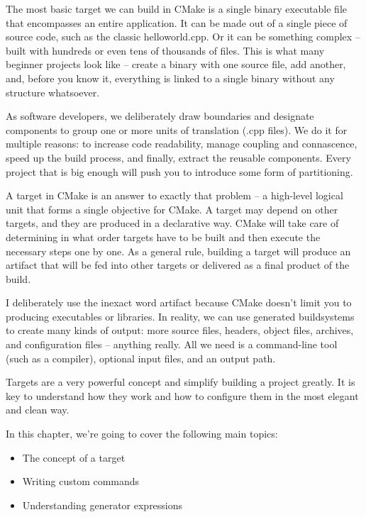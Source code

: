 The most basic target we can build in CMake is a single binary executable file that encompasses an entire application. It can be made out of a single piece of source code, such as the classic helloworld.cpp. Or it can be something complex – built with hundreds or even tens of thousands of files. This is what many beginner projects look like – create a binary with one source file, add another, and, before you know it, everything is linked to a single binary without any structure whatsoever.

As software developers, we deliberately draw boundaries and designate components to group one or more units of translation (.cpp files). We do it for multiple reasons: to increase code readability, manage coupling and connascence, speed up the build process, and finally, extract the reusable components. Every project that is big enough will push you to introduce some form of partitioning.

A target in CMake is an answer to exactly that problem – a high-level logical unit that forms a single objective for CMake. A target may depend on other targets, and they are produced in a declarative way. CMake will take care of determining in what order targets have to be built and then execute the necessary steps one by one. As a general rule, building a target will produce an artifact that will be fed into other targets or delivered as a final product of the build.

I deliberately use the inexact word artifact because CMake doesn't limit you to producing executables or libraries. In reality, we can use generated buildsystems to create many kinds of output: more source files, headers, object files, archives, and configuration files – anything really. All we need is a command-line tool (such as a compiler), optional input files, and an output path.

Targets are a very powerful concept and simplify building a project greatly. It is key to understand how they work and how to configure them in the most elegant and clean way.

In this chapter, we're going to cover the following main topics:

\begin{itemize}
\item 
The concept of a target

\item 
Writing custom commands

\item 
Understanding generator expressions
\end{itemize}